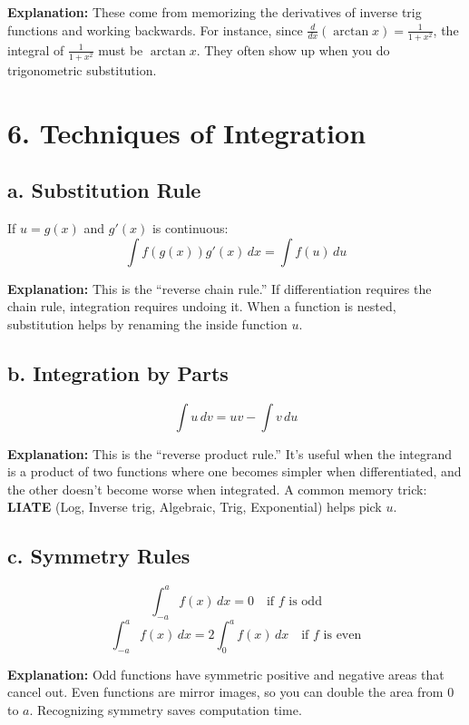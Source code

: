 \documentclass[12pt]{article}
\begin{document}
\textbf{Explanation:} These come from memorizing the derivatives of inverse trig functions and working backwards. For instance, since $\frac{d}{dx}(\arctan x) = \frac{1}{1+x^2}$, the integral of $\frac{1}{1+x^2}$ must be $\arctan x$. They often show up when you do trigonometric substitution. 

\section*{6. Techniques of Integration}

\subsection*{a. Substitution Rule}
If $u = g(x)$ and $g'(x)$ is continuous:
\[
\int f(g(x)) g'(x) \, dx = \int f(u) \, du
\]

\textbf{Explanation:} This is the ``reverse chain rule.'' If differentiation requires the chain rule, integration requires undoing it. When a function is nested, substitution helps by renaming the inside function $u$. 

\subsection*{b. Integration by Parts}
\[
\int u \, dv = uv - \int v \, du
\]

\textbf{Explanation:} This is the ``reverse product rule.'' It’s useful when the integrand is a product of two functions where one becomes simpler when differentiated, and the other doesn’t become worse when integrated. A common memory trick: \textbf{LIATE} (Log, Inverse trig, Algebraic, Trig, Exponential) helps pick $u$. 

\subsection*{c. Symmetry Rules}
\[
\int_{-a}^{a} f(x)\, dx = 0 \quad \text{if $f$ is odd}
\]
\[
\int_{-a}^{a} f(x)\, dx = 2\int_{0}^{a} f(x)\, dx \quad \text{if $f$ is even}
\]

\textbf{Explanation:} Odd functions have symmetric positive and negative areas that cancel out. Even functions are mirror images, so you can double the area from $0$ to $a$. Recognizing symmetry saves computation time. 
\end{document}

